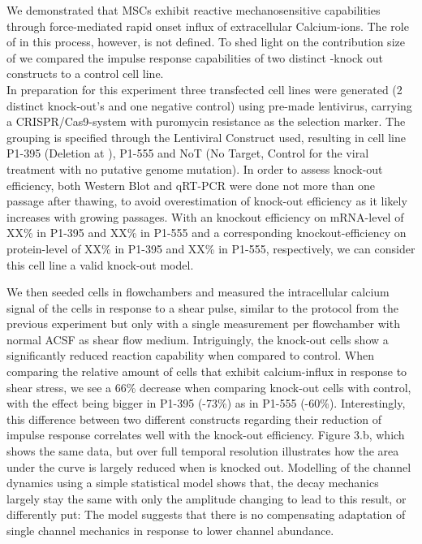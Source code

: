 We demonstrated that MSCs exhibit reactive mechanosensitive capabilities through force-mediated rapid onset influx of extracellular Calcium-ions. The role of \Piezo{} in this process, however, is not defined. To shed light on the contribution size of \Piezo{} we compared the impulse response capabilities of two distinct \Piezo{}-knock out constructs to a control cell line.\\
In preparation for this experiment three transfected cell lines were generated (2 distinct \Piezo{} knock-out's and one negative control) using pre-made lentivirus, carrying a CRISPR/Cas9-system with puromycin resistance as the selection marker. The grouping is specified through the Lentiviral Construct used, resulting in cell line P1-395 (Deletion at ), P1-555 and NoT (No Target, Control for the viral treatment with no putative genome mutation).  In order to assess knock-out efficiency, both Western Blot and qRT-PCR were done not more than one passage after thawing, to avoid overestimation of knock-out efficiency as it likely increases with growing passages. With an knockout efficiency on mRNA-level of XX\% in P1-395 and XX\% in P1-555 and a corresponding knockout-efficiency on protein-level of XX\% in P1-395 and XX\% in P1-555, respectively, we can consider this cell line a valid knock-out model.  

We then seeded cells in flowchambers and measured the intracellular calcium signal of the cells in response to a shear pulse, similar to the protocol from the previous experiment but only with a single measurement per flowchamber with normal ACSF as shear flow medium. Intriguingly, the knock-out cells show a significantly reduced reaction capability when compared to control.  When comparing the relative amount of cells that exhibit calcium-influx in response to shear stress, we see a 66\% decrease when comparing knock-out cells with control, with the effect being bigger in P1-395 (-73\%) as in P1-555 (-60\%). Interestingly, this difference between two different constructs regarding  their reduction of impulse response correlates well with the knock-out efficiency. Figure 3.b, which shows the same data, but over full temporal resolution illustrates how the area under the curve is largely reduced when \Piezo{} is knocked out. Modelling of the channel dynamics using a simple statistical model shows that, the decay mechanics largely stay the same with only the amplitude changing to lead to this result, or differently put: The model suggests that there is no compensating adaptation of single channel mechanics in response to lower channel abundance.

